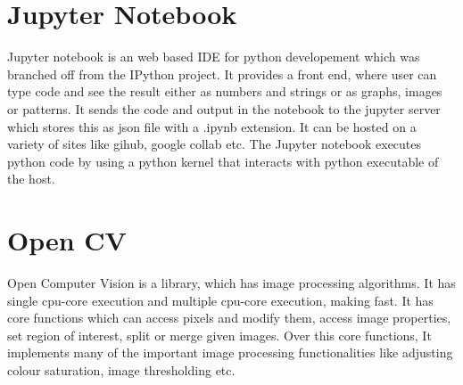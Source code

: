 \section{Jupyter Notebook}
Jupyter notebook is an web based IDE for python developement which was branched off from the IPython project. It provides a front end, where user can type code and see the result either as numbers and
strings or as graphs, images or patterns. It sends the code and output in the notebook to the jupyter server which stores this as json file with a .ipynb extension. It can be hosted on a variety of sites like gihub, google collab etc. The Jupyter notebook executes python code by using a python kernel that interacts with python executable of the host. 
\section{Open CV}
Open Computer Vision is a library, which has image processing algorithms. It has single cpu-core execution and multiple cpu-core execution, making fast. It has core functions which can access pixels and modify them, access image properties, set region of interest, split or merge given images. Over this core functions, It implements many of the important image processing functionalities like adjusting colour saturation, image thresholding etc.
